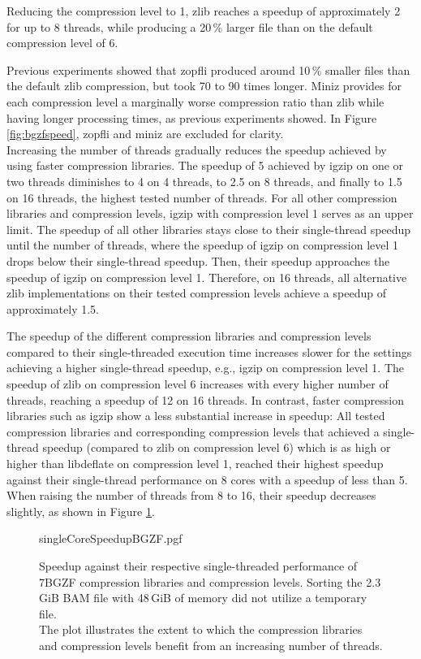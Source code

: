 Reducing the compression level to 1, zlib reaches a speedup of approximately 2 for up to 8 threads, while producing a 20\,\% larger file than on the default compression level of 6.

Previous experiments showed that zopfli produced around 10\,\% smaller files than the default zlib compression, but took 70 to 90 times longer.   
Miniz provides for each compression level a marginally worse compression ratio than zlib while having longer processing times, as previous experiments showed. In Figure \ref{fig:bgzfspeed}, zopfli and miniz are excluded for clarity.\\

Increasing the number of threads gradually reduces the speedup achieved by using faster compression libraries. The speedup of 5 achieved by igzip on one or two threads diminishes to 4 on 4 threads, to 2.5 on 8 threads, and finally to 1.5 on 16 threads, the highest tested number of threads. For all other compression libraries and compression levels, igzip with compression level 1 serves as an upper limit. The speedup of all other libraries stays close to their single-thread speedup until the number of threads, where the speedup of igzip on compression level 1 drops below their single-thread speedup. Then, their speedup approaches the speedup of igzip on compression level 1. Therefore, on 16 threads, all alternative zlib implementations on their tested compression levels achieve a speedup of approximately 1.5. 

The speedup of the different compression libraries and compression levels compared to their single-threaded execution time increases slower for the settings achieving a higher single-thread speedup, e.g., igzip on compression level 1. The speedup of zlib on compression level 6 increases with every higher number of threads, reaching a speedup of 12 on 16 threads. In contrast, faster compression libraries such as igzip show a less substantial increase in speedup: All tested compression libraries and corresponding compression levels that achieved a single-thread speedup (compared to zlib on compression level 6) which is as high or higher than libdeflate on compression level 1, reached their highest speedup against their single-thread performance on 8 cores with a speedup of less than 5. When raising the number of threads from 8 to 16, their speedup decreases slightly, as shown in Figure \ref{fig:bgzfSngleCoreSpeedup}. 
\begin{figure}[!htb]
        {singleCoreSpeedupBGZF.pgf}
    \caption{Speedup against their respective single-threaded performance of 7BGZF compression libraries and compression levels. Sorting the 2.3\,GiB BAM file with 48\,GiB of memory did not utilize a temporary file. \parents \threads \points\\  
    The plot illustrates the extent to which the compression libraries and compression levels benefit from an increasing number of threads. }
    \label{fig:bgzfSngleCoreSpeedup}
\end{figure}


